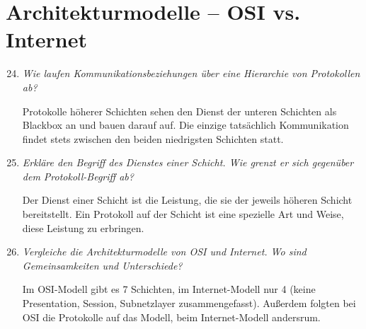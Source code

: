 \documentclass[hidelinks]{article}
\begin{document}
\section{Architekturmodelle -- OSI vs. Internet}
\begin{enumerate}
\setcounter{enumi}{23}
\item \textit{Wie laufen Kommunikationsbeziehungen über eine Hierarchie von Protokollen ab?}

Protokolle höherer Schichten sehen den Dienst der unteren Schichten als Blackbox an und bauen darauf auf. Die einzige tatsächlich Kommunikation findet stets zwischen den beiden niedrigsten Schichten statt.

\item \textit{Erkläre den Begriff des Dienstes einer Schicht. Wie grenzt er sich gegenüber dem Protokoll-Begriff ab?}

Der Dienst einer Schicht ist die Leistung, die sie der jeweils höheren Schicht bereitstellt. Ein Protokoll auf der Schicht ist eine spezielle Art und Weise, diese Leistung zu erbringen.

\item \textit{Vergleiche die Architekturmodelle von OSI und Internet. Wo sind Gemeinsamkeiten und	Unterschiede?} 

Im OSI-Modell gibt es 7 Schichten, im Internet-Modell nur 4 (keine Presentation, Session, Subnetzlayer zusammengefasst). Außerdem folgten bei OSI die Protokolle auf das Modell, beim Internet-Modell andersrum.
\end{enumerate}
\end{document}
